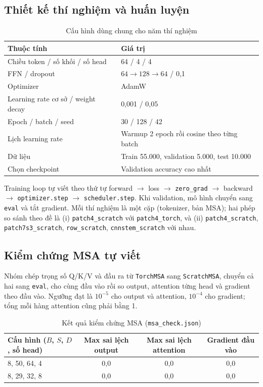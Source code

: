 \documentclass[12pt,a4paper]{article}
\begin{document}
\subsection{Thiết kế thí nghiệm và huấn luyện}

\begin{table}[H]
\centering
\caption{Cấu hình dùng chung cho năm thí nghiệm}
\begin{tabular}{ll}
\toprule
Thuộc tính & Giá trị \\
\midrule
Chiều token / số khối / số head & 64 / 4 / 4 \\
FFN / dropout & $64 \to 128 \to 64$ / 0,1 \\
Optimizer & AdamW \\
Learning rate cơ sở / weight decay & 0,001 / 0,05 \\
Epoch / batch / seed & 30 / 128 / 42 \\
Lịch learning rate & Warmup 2 epoch rồi cosine theo từng batch \\
Dữ liệu & Train 55.000, validation 5.000, test 10.000 \\
Chọn checkpoint & Validation accuracy cao nhất \\
\bottomrule
\end{tabular}
\end{table}

Training loop tự viết theo thứ tự forward $\to$ loss $\to$
\texttt{zero\_grad} $\to$ backward $\to$ \texttt{optimizer.step} $\to$
\texttt{scheduler.step}. Khi validation, mô hình chuyển sang \texttt{eval} và
tắt gradient. Mỗi thí nghiệm là một cặp (tokenizer, bản MSA); hai phép so sánh
theo đề là (i) \texttt{patch4\_scratch} với \texttt{patch4\_torch}, và (ii)
\texttt{patch4\_scratch}, \texttt{patch7s3\_scratch}, \texttt{row\_scratch},
\texttt{cnnstem\_scratch} với nhau.

\subsection{Kiểm chứng MSA tự viết}

Nhóm chép trọng số Q/K/V và đầu ra từ \texttt{TorchMSA} sang \texttt{ScratchMSA},
chuyển cả hai sang \texttt{eval}, cho cùng đầu vào rồi so output, attention
từng head và gradient theo đầu vào. Ngưỡng đạt là $10^{-5}$ cho output và
attention, $10^{-4}$ cho gradient; tổng mỗi hàng attention cũng phải bằng 1.

\begin{table}[H]
\centering
\caption{Kết quả kiểm chứng MSA (\texttt{msa\_check.json})}
\begin{tabular}{lccc}
\toprule
Cấu hình ($B$, $S$, $D$, số head) & Max sai lệch output & Max sai lệch attention & Gradient đầu vào \\
\midrule
8, 50, 64, 4 & 0,0 & 0,0 & 0,0 \\
8, 29, 32, 8 & 0,0 & 0,0 & 0,0 \\
\bottomrule
\end{tabular}
\end{table}
\end{document}
